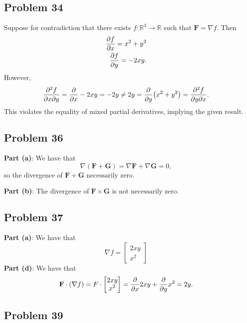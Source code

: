 \documentclass[11pt]{article}
\renewcommand{\grad}{\nabla}
\begin{document}
\subsection*{Problem 34}

Suppose for contradiction that there exists $f : \mathbb{R}^{3} \to \mathbb{R}$ such that $\mathbf{F} = \grad f$. Then
\begin{align*}
	\pdv{f}{x} = x^{2} + y^{2} \\
	\pdv{f}{y} = -2xy.
\end{align*}
However,
\[
	\pdv[2]{f}{x}{y} = \pdv{x} -2xy = -2y \ne 2y = \pdv{y} (x^{2} + y^{2}) = \pdv[2]{f}{y}{x}.
\]
This violates the equality of mixed partial derivatives, implying the given result.


\subsection*{Problem 36}

\textbf{Part (a)}: We have that
\[
	\grad (\mathbf{F} + \mathbf{G}) = \grad \mathbf{F} + \grad \mathbf{G} = 0,
\]
so the divergence of $\mathbf{F} + \mathbf{G}$ $\boxed{\text{necessarily zero}}$.

\textbf{Part (b)}: The divergence of $\mathbf{F} \times \mathbf{G}$ is $\boxed{\text{not necessarily zero}}$.


\subsection*{Problem 37}

\textbf{Part (a)}: We have that
\[
	\grad f = \begin{bmatrix} 2xy \\ x^{2} \end{bmatrix}
\]
\textbf{Part (d)}: We have that
\[
	\mathbf{F} \cdot (\grad f) = F \cdot \begin{bmatrix} 2xy  \\ x^{2} \end{bmatrix} = \pdv{x} 2xy + \pdv{y} x^{2} = 2y.
\]


\subsection*{Problem 39}
\end{document}
